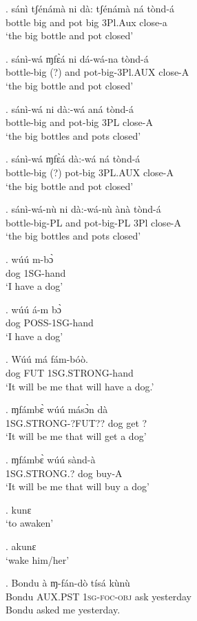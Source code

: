 \documentclass{assets/fieldnotes}
\begin{document}
\exg. sánì tʃénámà ni dà: tʃénámà ná tònd-á\\
     bottle big   and pot big   3Pl.Aux close-a\\
`the big bottle and pot  closed'

\exg. sánì-wá ɱfɛ̀á ni dá-wá-na tònd-á\\
bottle-big   (?)  and pot-big-3Pl.AUX close-A\\
`the big bottle and pot  closed'

\exg. sánì-wá ni dà:-wá aná tònd-á\\
bottle-big and pot-big 3PL close-A\\
`the big bottles and pots closed' 

\exg. sánì-wá ɱfɛ̀á dà:-wá ná tònd-á\\
bottle-big   (?) pot-big 3PL.AUX close-A\\
`the big bottle and pot closed' 

\ex. sánì-wá-nù ni dà:-wá-nù ànà tònd-á\\
bottle-big-PL and pot-big-PL 3Pl close-A\\
`the big bottles and pots closed'

\exg. wúú m-bɔ̀\\
dog 1SG-hand\\
`I have a dog'

\exg. wúú á-m bɔ̀\\
dog POSS-1SG-hand\\
`I have a dog'

\exg. W\'{u}\'{u} m\'{a} f\'{a}m-b\'{o}\`{o}. \\
dog FUT 1SG.STRONG-hand \\
`It will be me that will have a dog.' 

\exg. ɱfámbɛ̀ wúú másɔ̀n dà\\
1SG.STRONG-?FUT?? dog get  ?\\
`It will be me that will get a dog'

\exg. ɱfámbɛ̀ wúú sànd-à\\
1SG.STRONG.? dog buy-A\\
`It will be me that will buy a dog'

\ex. kunɛ\\
`to awaken'

\ex. akunɛ\\
`wake him/her'

\exg. Bondu à ɱ-fán-dò tísá kùnù\\
Bondu \textsc{AUX.PST} 1\textsc{sg}-\textsc{foc}-\textsc{obj} ask yesterday\\
Bondu asked me yesterday.
\end{document}
